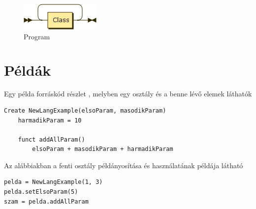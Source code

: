 \begin{figure}[h!]
\centering
\includegraphics[scale=1]{kepek/rr_program.png}
\caption{Program}
\label{fig:rr_program}
\end{figure}

\section{Példák}

Egy példa forráskód részlet , melyben egy osztály és a benne lévő elemek láthatók

\begin{verbatim}
Create NewLangExample(elsoParam, masodikParam)
	harmadikParam = 10
	
	funct addAllParam()
		elsoParam + masodikParam + harmadikParam
\end{verbatim}
		
Az alábbiakban a fenti osztály példányosítása és használatának példája látható

\begin{verbatim}
pelda = NewLangExample(1, 3)
pelda.setElsoParam(5)
szam = pelda.addAllParam
\end{verbatim}
